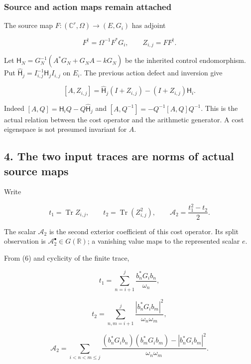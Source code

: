 \documentclass[
  11pt,
]{article}
\begin{document}
\subsubsection{Source and action maps remain
attached}\label{source-and-action-maps-remain-attached}

The source map \(F:(\mathbb C^r,\Omega)\to(E,G_i)\) has adjoint

\[
 F^{\dagger}=\Omega^{-1}F^*G_i,
 \qquad Z_{i,j}=FF^{\dagger}.                                   \tag{9}
\]

Let \(\mathsf H_N=G_N^{-1}(A^*G_N+G_NA-kG_N)\) be the inherited control
endomorphism. Put
\(\widehat{\mathsf H}_j=I_{i,j}^{-1}\mathsf H_jI_{i,j}\) on \(E_i\). The
previous action defect and inversion give

\[
 \boxed{[A,Z_{i,j}]=
 \widehat{\mathsf H}_j(I+Z_{i,j})-(I+Z_{i,j})\mathsf H_i.}        \tag{10}
\]

Indeed \([A,Q]=\mathsf H_iQ-Q\widehat{\mathsf H}_j\) and
\([A,Q^{-1}]=-Q^{-1}[A,Q]Q^{-1}\). This is the actual relation between
the cost operator and the arithmetic generator. A cost eigenspace is not
presumed invariant for \(A\).

\subsection{4. The two input traces are norms of actual source
maps}\label{the-two-input-traces-are-norms-of-actual-source-maps}

Write

\[
 t_1=\operatorname{Tr}Z_{i,j},\qquad
 t_2=\operatorname{Tr}(Z_{i,j}^2),\qquad
 \mathcal A_2=\frac{t_1^2-t_2}{2}.                                      \tag{11}
\]

The scalar \(\mathcal A_2\) is the second exterior coefficient of this
cost operator. Its split observation is
\(\mathcal A_2^\bullet\in G(\mathbb R)\); a vanishing value maps to the
represented scalar \(e\).

From (6) and cyclicity of the finite trace,

\[
 \boxed{t_1=\sum_{n=i+1}^{j}\frac{b_n^*G_ib_n}{\omega_n},}
\]

\[
 \boxed{t_2=\sum_{n,m=i+1}^{j}
 \frac{|b_n^*G_ib_m|^2}{\omega_n\omega_m},}                      \tag{12}
\]

\[
 \boxed{\mathcal A_2=\sum_{i<n<m\le j}
 \frac{(b_n^*G_ib_n)(b_m^*G_ib_m)-|b_n^*G_ib_m|^2}
 {\omega_n\omega_m}.}                                          \tag{13}
\]
\end{document}
